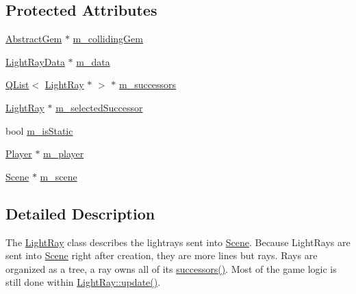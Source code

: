 \subsection*{Protected Attributes}
\begin{DoxyCompactItemize}
\item 
\hyperlink{class_abstract_gem}{Abstract\+Gem} $\ast$ \hyperlink{class_light_ray_ac11396a5ac4a0899ca4bad5d88300fdd}{m\+\_\+colliding\+Gem}
\item 
\hyperlink{class_light_ray_data}{Light\+Ray\+Data} $\ast$ \hyperlink{class_light_ray_acba0c9beeba8ea2863a022910d4ffc34}{m\+\_\+data}
\item 
\hyperlink{singleton_q_list}{Q\+List}$<$ \hyperlink{class_light_ray}{Light\+Ray} $\ast$ $>$ $\ast$ \hyperlink{class_light_ray_a669e04446c77fc44bee41146c1883356}{m\+\_\+successors}
\item 
\hyperlink{class_light_ray}{Light\+Ray} $\ast$ \hyperlink{class_light_ray_a9e430528b861007696716fbd054c9de3}{m\+\_\+selected\+Successor}
\item 
bool \hyperlink{class_light_ray_af44c254c7782710304489afdabd5303a}{m\+\_\+is\+Static}
\item 
\hyperlink{class_player}{Player} $\ast$ \hyperlink{class_light_ray_a55cf457d13b240178933f0a73d6f7b2b}{m\+\_\+player}
\item 
\hyperlink{class_scene}{Scene} $\ast$ \hyperlink{class_light_ray_a9f99d6386ed92c979889f38b5348d628}{m\+\_\+scene}
\end{DoxyCompactItemize}


\subsection{Detailed Description}
The \hyperlink{class_light_ray}{Light\+Ray} class describes the lightrays sent into \hyperlink{class_scene}{Scene}.  Because Light\+Rays are sent into \hyperlink{class_scene}{Scene} right after creation, they are more lines but rays. Rays are organized as a tree, a ray owns all of its \hyperlink{class_light_ray_a6673a77eb8fcd32dcfde26a1b112d303}{successors()}. Most of the game logic is still done within \hyperlink{class_light_ray_acf06a71a307433fa5b220baccf809e64}{Light\+Ray\+::update()}. 

